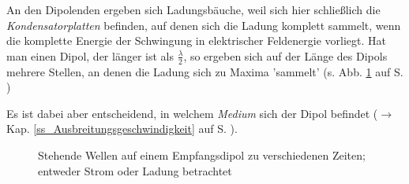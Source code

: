 An den Dipolenden ergeben sich Ladungsbäuche, weil sich hier schließlich die \textit{Kondensatorplatten} befinden, auf denen sich die Ladung komplett sammelt, wenn die komplette Energie der Schwingung in elektrischer Feldenergie vorliegt. Hat man einen Dipol, der länger ist als \(\frac{\lambda}{2}\), so ergeben sich auf der Länge des Dipols mehrere Stellen, an denen die Ladung sich zu Maxima 'sammelt' (s. Abb. \ref{img_Ix-Qx} auf S. \pageref{img_Ix-Qx})

Es ist dabei aber entscheidend, in welchem \emph{Medium} sich der Dipol befindet (\(\rightarrow\) Kap. \ref{ss_Ausbreitungsgeschwindigkeit} auf S. \pageref{ss_Ausbreitungsgeschwindigkeit}).


\begin{figure}
\centering
 	\caption{Stehende Wellen auf einem Empfangsdipol zu verschiedenen Zeiten; entweder Strom oder Ladung betrachtet}
 	\label{img_Ix-Qx}
\end{figure}






